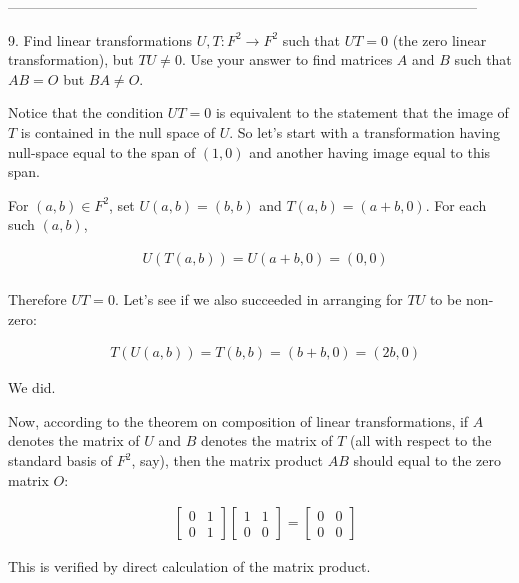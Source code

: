 \documentclass[12pt]{amsart}
\begin{document}
\noindent-----------------------------------------------------------------------------------------------------

\newpage

9.  Find linear transformations $U,T:F^2\rightarrow F^2$ such that $UT=0$ (the zero linear transformation), but $TU\neq 0$.  Use your answer to find matrices $A$ and $B$ such that $AB=O$ but $BA\neq O$.

\vspace{1pc}

Notice that the condition $UT=0$ is equivalent to the statement that the image of $T$ is contained in the null space of $U$.  So let's start with a transformation having null-space equal to the span of $(1,0)$ and another having image equal to this span.

For $(a,b)\in F^2$, set $U(a,b)=(b,b)$ and $T(a,b)=(a+b,0)$.  For each such $(a,b)$, 

\begin{align*}
& U(T(a,b)) = U(a+b,0) = (0,0) \\
\end{align*}

Therefore $UT = 0$.  Let's see if we also succeeded in arranging for $TU$ to be non-zero:

\begin{align*}
& T(U(a,b)) = T(b,b) = (b+b,0) = (2b,0) 
\end{align*}

We did.

Now, according to the theorem on composition of linear transformations, if $A$ denotes the matrix of $U$ and $B$ denotes the matrix of $T$ (all with respect to the standard basis of $F^2$, say), then the matrix product $AB$ should equal to the zero matrix $O$:

\begin{align*}
& \begin{bmatrix} 0 & 1\\ 0 & 1 \end{bmatrix} \begin{bmatrix} 1 & 1 \\ 0 & 0\end{bmatrix} = \begin{bmatrix} 0 & 0 \\ 0 & 0 \end{bmatrix}
\end{align*}

This is verified by direct calculation of the matrix product.
\end{document}
